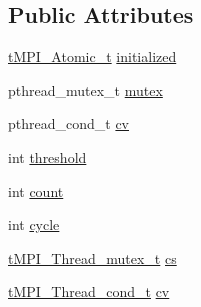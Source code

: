 \subsection*{\-Public \-Attributes}
\begin{DoxyCompactItemize}
\item 
\hyperlink{include_2thread__mpi_2atomic_2gcc_8h_a2c33794dc540e3b07cffc1f81a3fe4b4}{t\-M\-P\-I\-\_\-\-Atomic\-\_\-t} \hyperlink{structtMPI__Thread__barrier_a312e78b6d376c05247b52d3689c53144}{initialized}
\item 
pthread\-\_\-mutex\-\_\-t \hyperlink{structtMPI__Thread__barrier_a58cb4561b37cc6e66d18e308e15eab36}{mutex}
\item 
pthread\-\_\-cond\-\_\-t \hyperlink{structtMPI__Thread__barrier_aebf974065e952a130515fae5d86598a3}{cv}
\item 
int \hyperlink{structtMPI__Thread__barrier_afd7dba8362370830114a00e04f1d6897}{threshold}
\item 
int \hyperlink{structtMPI__Thread__barrier_a48eaa41e8bb9f42bf287f75f66acbf3f}{count}
\item 
int \hyperlink{structtMPI__Thread__barrier_a40a3ce799420fdf21e5efadd5f035f84}{cycle}
\item 
\hyperlink{structtMPI__Thread__mutex__t}{t\-M\-P\-I\-\_\-\-Thread\-\_\-mutex\-\_\-t} \hyperlink{structtMPI__Thread__barrier_adacc4aafae56bf3a787ab3434cd327ae}{cs}
\item 
\hyperlink{structtMPI__Thread__cond__t}{t\-M\-P\-I\-\_\-\-Thread\-\_\-cond\-\_\-t} \hyperlink{structtMPI__Thread__barrier_a36808c4fc06160450a84e5eeb8d008e9}{cv}
\end{DoxyCompactItemize}


